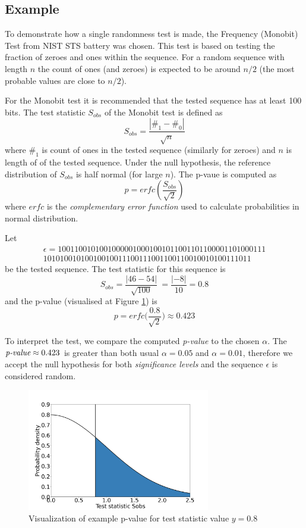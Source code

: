 \documentclass[
  digital,     %
  oneside,     %
  nosansbold,  %
  nocolorbold, %
  nolof,         %
  nolot,         %
]{fithesis4}
\begin{document}
\subsection{Example} \label{chap:rand-example}

To demonstrate how a single randomness test is made, the Frequency (Monobit) Test from NIST STS battery was chosen. \cite[p. 2-2]{nist_special} This test is based on testing the fraction of zeroes and ones within the sequence. For a random sequence with length $n$ the  count of ones (and zeroes) is expected to be around $n/2$ (the most probable values are close to $n/2$). 

For the Monobit test it is recommended that the tested sequence has at least 100 bits. The test statistic $S_{obs}$ of the Monobit test is defined as \[S_{obs} = \dfrac{|\#_1 - \#_0|}{\sqrt{n}}\] where $\#_1$ is count of ones in the tested sequence (similarly for zeroes) and $n$ is length of of the tested sequence. Under the null hypothesis, the reference distribution of $S_{obs}$ is half normal (for large $n$). The p-vaue is computed as \[ p = erfc(\dfrac{S_{obs}}{\sqrt{2}}) \] where $erfc$ is the \emph{complementary error function} used to calculate probabilities in normal distribution.

 Let
\[\begin{split}
    \epsilon = 10011001010010000010001001011001101100001101000111\\10101001010010010011100111001100110010010100111011
\end{split}\]
 be the tested sequence. The test statistic for this sequence is 
 \[S_{obs} = \dfrac{|46 - 54|}{\sqrt{100}}\ = \dfrac{|-8|}{10} = 0.8\]
 and the p-value (visualised at Figure \ref{fig:example}) is 
 \[p = erfc\biggl(\dfrac{0.8}{\sqrt{2}}\biggr) \approx 0.423\]

To interpret the test, we compare the computed \emph{p-value} to the chosen $\alpha$. The $\emph{p-value} \approx 0.423$ is greater than both usual $\alpha = 0.05$ and $\alpha = 0.01$, therefore we accept the null hypothesis for both \emph{significance levels} and the sequence $\epsilon$ is considered random.

\begin{figure}
  \begin{center}
    \includegraphics[width=8cm]{figures/test_example.png}
  \end{center}
  \caption{Visualization of example p-value for test statistic value $y = 0.8$}
  \label{fig:example}
\end{figure}
\end{document}
